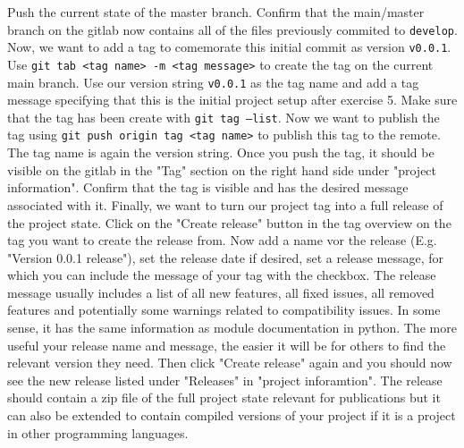 \documentclass[]{erlangen-problemset}
\begin{document}
\begin{problem}[title={Cloning the project again from the remote and setting up a release}]
Push the current state of the master branch. 
Confirm that the main/master branch on the gitlab now contains all of the files previously commited to \texttt{develop}.
\Question Now, we want to add a tag to comemorate this initial commit as version \texttt{v0.0.1}.
Use \texttt{git tab <tag name> -m <tag message>} to create the tag on the current main branch. 
Use our version string \texttt{v0.0.1} as the tag name and add a tag message specifying that this is the initial project setup after exercise 5.
Make sure that the tag has been create with \texttt{git tag --list}. 
Now we want to publish the tag using \texttt{git push origin tag <tag name>} to publish this tag to the remote. 
The tag name is again the version string. 
Once you push the tag, it should be visible on the gitlab in the "Tag" section on the right hand side under "project information".
Confirm that the tag is visible and has the desired message associated with it. 
\Question Finally, we want to turn our project tag into a full release of the project state. 
Click on the "Create release" button in the tag overview on the tag you want to create the release from. 
Now add a name vor the release (E.g. "Version 0.0.1 release"), set the release date if desired, set a release message, for which you can include the message of your tag with the checkbox. 
The release message usually includes a list of all new features, all fixed issues, all removed features and potentially some warnings related to compatibility issues. 
In some sense, it has the same information as module documentation in python. 
The more useful your release name and message, the easier it will be for others to find the relevant version they need. 
Then click "Create release" again and you should now see the new release listed under "Releases" in "project inforamtion". 
The release should contain a zip file of the full project state relevant for publications but it can also be extended to contain compiled versions of your project if it is a project in other programming languages. 
\end{problem}

\end{document}
